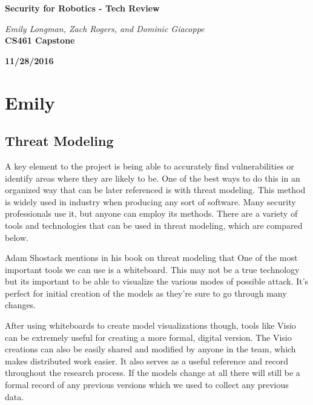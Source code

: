 \documentclass[IEEEtran,letterpaper,10pt,titlepage,draftclsnofoot,onecolumn]{article}
\begin{document}
\begin{titlepage}
  \begin{center}
    \vspace*{1cm}
    
    \huge
    \textbf{Security for Robotics - Tech Review}      
  \vspace{0.5cm}
        
    \textit{Emily Longman, Zach Rogers, and Dominic Giacoppe}\\ 
  \vspace{0.5cm}
    \vfill
    \large
    \textbf{CS461 Capstone}\\ 
  \vspace{5mm}

    \textbf{11/28/2016}\\ 
    
    \vfill
    \end{center}
\end{titlepage}

\section*{Emily}

\subsection*{Threat Modeling}
A key element to the project is being able to accurately find vulnerabilities or identify areas where they are likely to be. 
One of the best ways to do this in an organized way that can be later referenced is with threat modeling. 
This method is widely used in industry when producing any sort of software. Many security professionals use it, but anyone can employ its methods. 
There are a variety of tools and technologies that can be used in threat modeling, which are compared below.

Adam Shostack mentions in his book on threat modeling that  \cite[p.203]{TMDS}
One of the most important tools we can use is a whiteboard.
This may not be a true technology but its important to be able to visualize the various modes of possible attack.
It's perfect for initial creation of the models as they're sure to go through many changes.

After using whiteboards to create model visualizations though, tools like Visio can be extremely useful for creating a more formal, digital version.
The Visio creations can also be easily shared and modified by anyone in the team, which makes distributed work easier.
It also serves as a useful reference and record throughout the research process.
If the models change at all there will still be a formal record of any previous versions which we used to collect any previous data.
\end{document}

